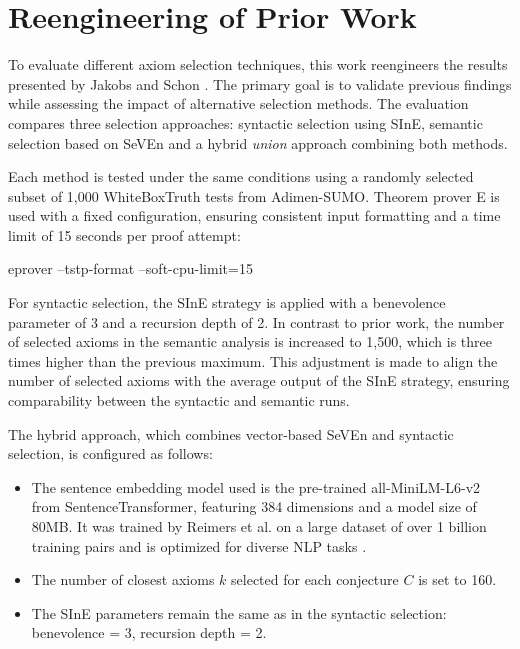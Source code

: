 \documentclass[english,version-2020-11]{uzl-thesis}
\begin{document}
\section{Reengineering of Prior Work}

To evaluate different axiom selection techniques, this work reengineers the results presented by Jakobs and Schon \cite{Schon2024}. The primary goal is to validate previous findings while assessing the impact of alternative selection methods. The evaluation compares three selection approaches: syntactic selection using SInE, semantic selection based on SeVEn and a hybrid \textit{union} approach combining both methods.

Each method is tested under the same conditions using a randomly selected subset of 1,000 WhiteBoxTruth tests from Adimen-SUMO. Theorem prover E is used with a fixed configuration, ensuring consistent input formatting and a time limit of 15 seconds per proof attempt:

\begin{Pseudocode}[morekeywords = {add, create}, deletekeywords={to}, numbers=left,
    caption = {Command to run Prover E}]
    eprover --tstp-format --soft-cpu-limit=15
\end{Pseudocode}

For syntactic selection, the SInE strategy is applied with a benevolence parameter of 3 and a recursion depth of 2. In contrast to prior work, the number of selected axioms in the semantic analysis is increased to 1,500, which is three times higher than the previous maximum. This adjustment is made to align the number of selected axioms with the average output of the SInE strategy, ensuring comparability between the syntactic and semantic runs.

The hybrid approach, which combines vector-based SeVEn and syntactic selection, is configured as follows:

\begin{itemize}
    \item The sentence embedding model used is the pre-trained all-MiniLM-L6-v2 from SentenceTransformer, featuring 384 dimensions and a model size of 80MB. It was trained by Reimers et al. on a large dataset of over 1 billion training pairs and is optimized for diverse NLP tasks \cite{Reimers2019, Sentencetransformers2019}.
    \item The number of closest axioms \( k \) selected for each conjecture \( C \) is set to 160.
    \item The SInE parameters remain the same as in the syntactic selection: benevolence = 3, recursion depth = 2.
\end{itemize}
\end{document}
